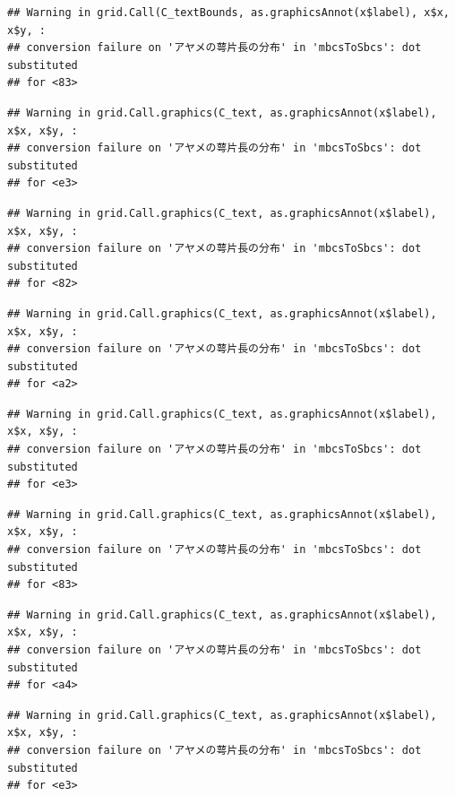 \documentclass[
]{book}
\begin{document}
\begin{verbatim}
## Warning in grid.Call(C_textBounds, as.graphicsAnnot(x$label), x$x, x$y, :
## conversion failure on 'アヤメの萼片長の分布' in 'mbcsToSbcs': dot substituted
## for <83>
\end{verbatim}

\begin{verbatim}
## Warning in grid.Call.graphics(C_text, as.graphicsAnnot(x$label), x$x, x$y, :
## conversion failure on 'アヤメの萼片長の分布' in 'mbcsToSbcs': dot substituted
## for <e3>
\end{verbatim}

\begin{verbatim}
## Warning in grid.Call.graphics(C_text, as.graphicsAnnot(x$label), x$x, x$y, :
## conversion failure on 'アヤメの萼片長の分布' in 'mbcsToSbcs': dot substituted
## for <82>
\end{verbatim}

\begin{verbatim}
## Warning in grid.Call.graphics(C_text, as.graphicsAnnot(x$label), x$x, x$y, :
## conversion failure on 'アヤメの萼片長の分布' in 'mbcsToSbcs': dot substituted
## for <a2>
\end{verbatim}

\begin{verbatim}
## Warning in grid.Call.graphics(C_text, as.graphicsAnnot(x$label), x$x, x$y, :
## conversion failure on 'アヤメの萼片長の分布' in 'mbcsToSbcs': dot substituted
## for <e3>
\end{verbatim}

\begin{verbatim}
## Warning in grid.Call.graphics(C_text, as.graphicsAnnot(x$label), x$x, x$y, :
## conversion failure on 'アヤメの萼片長の分布' in 'mbcsToSbcs': dot substituted
## for <83>
\end{verbatim}

\begin{verbatim}
## Warning in grid.Call.graphics(C_text, as.graphicsAnnot(x$label), x$x, x$y, :
## conversion failure on 'アヤメの萼片長の分布' in 'mbcsToSbcs': dot substituted
## for <a4>
\end{verbatim}

\begin{verbatim}
## Warning in grid.Call.graphics(C_text, as.graphicsAnnot(x$label), x$x, x$y, :
## conversion failure on 'アヤメの萼片長の分布' in 'mbcsToSbcs': dot substituted
## for <e3>
\end{verbatim}
\end{document}
